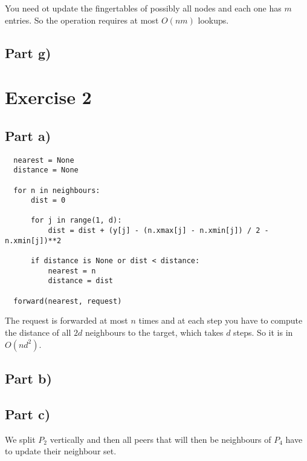 \documentclass[10pt,a4paper]{article}
\begin{document}
You need ot update the fingertables of possibly all nodes and each one has $m$ entries.
So the operation requires at most $O(nm)$ lookups.

\subsection*{Part g)}

\section*{Exercise 2}

\subsection*{Part a)}

\begin{verbatim}
  nearest = None
  distance = None

  for n in neighbours:
      dist = 0

      for j in range(1, d):
          dist = dist + (y[j] - (n.xmax[j] - n.xmin[j]) / 2 - n.xmin[j])**2

      if distance is None or dist < distance:
          nearest = n
          distance = dist

  forward(nearest, request)
\end{verbatim}

The request is forwarded at most $n$ times and at each step you have to compute the distance of all $2d$ neighbours to the target, which takes $d$ steps.
So it is in $O(nd^{2})$.

\subsection*{Part b)}

\subsection*{Part c)}

We split $P_{2}$ vertically and then all peers that will then be neighbours of $P_{4}$ have to update their neighbour set.
\end{document}
